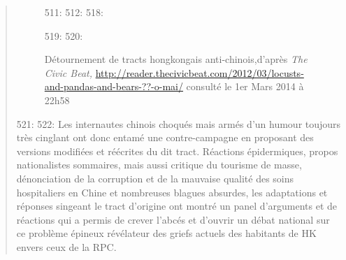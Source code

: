 \begin{quote}
\begin{description}
\begin{figure}
{511:     }
512:     
518:     \caption[Détournement de tracts hongkongais anti-chinois]{Détournement de tracts hongkongais anti-chinois,d{\textquoteright}apr\`es \textit{The Civic Beat, }\url{http://reader.thecivicbeat.com/2012/03/locusts-and-pandas-and-bears-??-o-mai/} consult\'e le 1er Mars 2014 \`a 22h58}
519:     \label{fig:hk-tract}
520: \end{figure}
521: 
522: Les internautes chinois choqu\'es mais arm\'es d{\textquoteright}un humour toujours tr\`es cinglant ont donc entam\'e une contre-campagne en proposant des versions modifi\'ees et r\'e\'ecrites du dit tract. R\'eactions \'epidermiques, propos nationalistes sommaires, mais aussi critique du tourisme de masse, d\'enonciation de la corruption et de la mauvaise qualit\'e des soins hospitaliers en Chine et nombreuses blagues absurdes, les adaptations et r\'eponses singeant le tract d{\textquoteright}origine ont montr\'e un panel d{\textquoteright}arguments et de r\'eactions qui a permis de crever l{\textquoteright}abc\'es et d{\textquoteright}ouvrir un d\'ebat national sur ce probl\`eme \'epineux r\'ev\'elateur des griefs actuels des habitants de HK envers ceux de la RPC.  

\end{description}
\end{quote}

